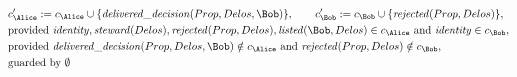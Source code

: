 \begin{align*}
&
c'_
{
\Alice
}
 := 
c_
{
\Alice
}
 \cup 
\{
\mathit{\detokenize{
delivered_decision
}}
(
Prop
,
Delos
,
\Bob
)
\}
, \qquad 
c'_
{
\Bob
}
 := 
c_
{
\Bob
}
 \cup 
\{
\mathit{\detokenize{
rejected
}}
(
Prop
,
Delos
)
\}
,\\
&
\text{provided } 
\mathit{\detokenize{
identity
}}
,
\mathit{\detokenize{
steward
}}
(
Delos
)
,
\mathit{\detokenize{
rejected
}}
(
Prop
,
Delos
)
,
\mathit{\detokenize{
listed
}}
(
\Bob
,
Delos
)
 \in c_
{
\Alice
}
 \text{ and } 
\mathit{\detokenize{
identity
}}
 \in c_
{
\Bob
}
,\\
&
\text{provided } 
\mathit{\detokenize{
delivered_decision
}}
(
Prop
,
Delos
,
\Bob
)
 \notin c_
{
\Alice
}
 \text{ and } 
\mathit{\detokenize{
rejected
}}
(
Prop
,
Delos
)
 \notin c_
{
\Bob
}
,\\
&
\text{guarded by } \emptyset
\end{align*}

